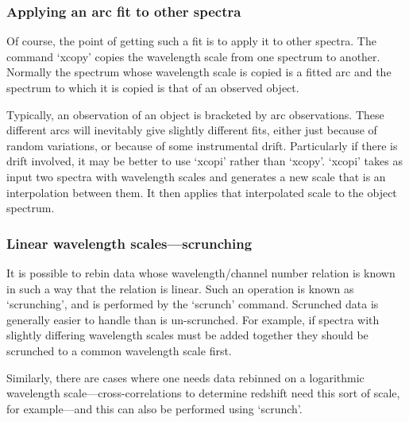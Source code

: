 \documentclass[11pt,twoside]{article}
\newcommand{\latorhtm}[2]{#1}
\newcommand{\latorhtm}[2]{#2}
\begin{document}

\subsubsection{\label{techno8xcopy}Applying an arc fit to other spectra}

   Of course, the point of getting such a fit is to apply it to other
   spectra.  The command `xcopy' copies the wavelength scale from one
   spectrum to another.  Normally the spectrum whose wavelength scale is
   copied is a fitted arc and the spectrum to which it is copied is that
   of an observed object.

   Typically, an observation of an object is bracketed by arc
   observations. These different arcs will inevitably give slightly
   different fits, either just because of random variations, or because
   of some instrumental drift. Particularly if there is drift involved,
   it may be better to use `xcopi' rather than `xcopy'.  `xcopi' takes
   as input two spectra with wavelength scales and generates a new scale
   that is an interpolation between them.  It then applies that
   interpolated scale to the object spectrum.


\subsubsection{\label{techno8scrunch}Linear wavelength
   scales\latorhtm{---}{-}scrunching}

   It is possible to rebin data whose wavelength/channel number relation
   is known in such a way that the relation is linear.  Such an
   operation is known as `scrunching', and is performed by the `scrunch'
   command. Scrunched data is generally easier to handle than is
   un-scrunched.  For example, if spectra with slightly differing
   wavelength scales must be added together they should be scrunched to
   a common wavelength scale first.

   Similarly, there are cases where one needs data rebinned on a
   logarithmic wavelength scale\latorhtm{---}{-}cross-correlations to determine
   redshift need this sort of scale, for example\latorhtm{---}{-}and this can
   also be performed using `scrunch'.
\end{document}
